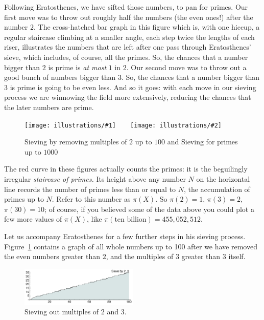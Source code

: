 \documentclass[11pt]{article}
\newcommand{\illtwo}[4]{ 
   \begin{figure}[htbp]
   \begin{center}
   \texttt{[image: illustrations/\#1]}$\qquad$\texttt{[image: illustrations/\#2]}
   \caption{#4}
    \end{center}
    \end{figure}
}
\theoremstyle{plain}
\theoremstyle{definition}
\numberwithin{equation}{section}
\numberwithin{figure}{section}
\numberwithin{table}{section}
\begin{document}
Following Eratosthenes, we have sifted those numbers, to pan for
primes. Our first move was to throw out roughly half the numbers (the
even ones!) after the number $2$. The cross-hatched bar graph in this
figure which is, with one hiccup, a regular staircase climbing at a
smaller angle, each step twice the lengths of each riser, illustrates
the numbers that are left after one pass through Eratosthenes' sieve,
which includes, of course, all the primes. So, the chances that a
number bigger than $2$ is prime is {\em at most} $1$ in $2$.  Our
second move was to throw out a good bunch of numbers bigger than $3$.
So, the chances that a number bigger than $3$ is prime is going to be
even less.  And so it goes: with each move in our
sieving process we are winnowing the field more extensively, reducing
the chances that the later numbers are prime.

\illtwo{sieve_2_200}{sieve1000}{.45}{Sieving by removing multiples of $2$ up to $100$ and Sieving for primes up to $1000$}
          
The red curve in these figures actually counts the primes: it is the
beguilingly irregular {\em staircase of primes.}  Its height above any
number $N$ on the horizontal line records the number of primes less
than or equal to $N$, the accumulation of primes up to $N$.  Refer to
this number as $\pi(X)$. So $\pi(2)=1$, $\pi(3) = 2$, $\pi(30) = 10$; of
course, if you believed some of the data above you could plot a few
more values of $\pi(X)$, like $\pi(\text{ten billion}) = 455,052,512$.
                              
                                 
Let us accompany Eratosthenes for a few further steps in his sieving
process.  Figure~\ref{fig:sieve3_100} contains a graph of all whole
numbers up to 100 after we have removed the even numbers greater than
$2$, and the multiples of $3$ greater than $3$ itself.
                                 
\begin{figure}[h]
\begin{center}
\includegraphics[width=0.5\textwidth]{illustrations/sieves3_100}
\caption{Sieving out multiples of $2$ and $3$.\label{fig:sieve3_100}}
\end{center}
\end{figure}
\end{document}
